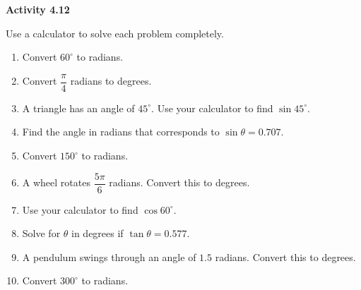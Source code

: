 \vspace{0.3ex}
\noindent\textbf{Activity 4.12}

\vspace{0.2ex}

Use a calculator to solve each problem completely.

\begin{enumerate}
    \item Convert \(60^\circ\) to radians.
    \item Convert \( \dfrac{\pi}{4} \) radians to degrees.
    \item A triangle has an angle of \(45^\circ\). Use your calculator to find \(\sin 45^\circ\).
    \item Find the angle in radians that corresponds to \(\sin \theta = 0.707\).
    \item Convert \(150^\circ\) to radians.
    \item A wheel rotates \( \dfrac{5\pi}{6} \) radians. Convert this to degrees.
    \item Use your calculator to find \(\cos 60^\circ\).
    \item Solve for \(\theta\) in degrees if \(\tan \theta = 0.577\).
    \item A pendulum swings through an angle of \(1.5\) radians. Convert this to degrees.
    \item Convert \(300^\circ\) to radians.
\end{enumerate}
